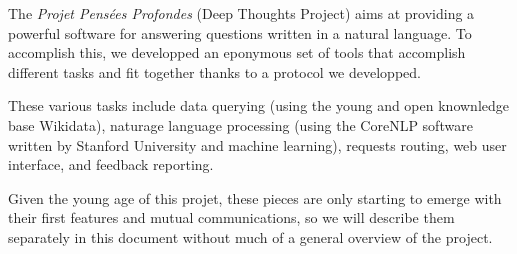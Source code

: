 The {\em Projet Pensées Profondes} (Deep Thoughts Project) aims at
providing a powerful software for answering questions written in a
natural language.
To accomplish this, we developped an eponymous set of tools that
accomplish different tasks and fit together thanks to a protocol
we developped.

These various tasks include data querying (using the young and open
knownledge base Wikidata), naturage language processing (using the
CoreNLP software written by Stanford University and machine learning),
requests routing, web user interface, and feedback reporting.

Given the young age of this projet, these pieces are only starting
to emerge with their first features and mutual communications,
so we will describe them separately in this document without
much of a general overview of the project.
